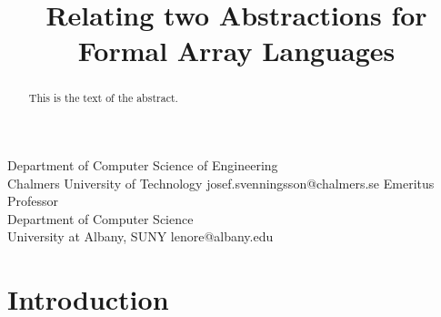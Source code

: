 \documentclass[preprint]{sigplanconf}
\begin{document}
\setlength{\pdfpageheight}{\paperheight}
\setlength{\pdfpagewidth}{\paperwidth}






\title{Relating two Abstractions for Formal Array Languages}

           {Department of Computer Science of Engineering\\Chalmers University of Technology}
           {josef.svenningsson@chalmers.se}
           {Emeritus Professor\\Department of Computer Science\\
University at Albany, SUNY}
           {lenore@albany.edu}

\maketitle

\begin{abstract}
This is the text of the abstract.
\end{abstract}




\section{Introduction}
\end{document}
